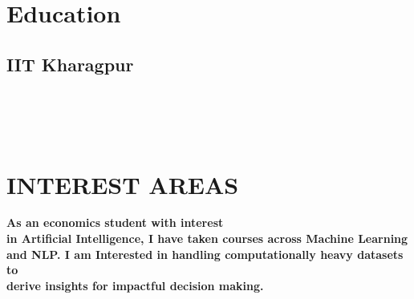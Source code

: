 \documentclass[]{deedy-resume-openfont}
\begin{document}
%
%

%
%

\begin{minipage}[t]{0.33\textwidth} 


\section{Education} 

\subsection{IIT Kharagpur}
\sectionsep
\\~\\~\\

\section{INTEREST AREAS}
\textbf{As an economics student with interest \\in Artificial Intelligence, I have taken courses across Machine Learning and NLP. I am Interested in handling computationally heavy datasets to\\ derive insights for impactful decision making.}
\sectionsep
\\~\\~\\



\end{minipage}
\end{document}
